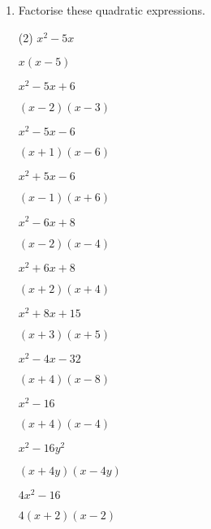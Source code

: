 \begin{enumerate} [leftmargin=0cm]
\item Factorise these quadratic expressions.
\begin{tasks}[label=(\alph*), after-item-skip=2pt,after-skip=3pt, label-width=4ex](2)
    \task  $ x^2 -5x                               $  \\  \begin{envAnswer} $  x(x-5)            $ \end{envAnswer}
    \task  $ x^2 -5x +6                            $  \\  \begin{envAnswer} $  (x-2)(x-3)        $ \end{envAnswer}
    \task  $ x^2 -5x -6                            $  \\  \begin{envAnswer} $  (x+1)(x-6)        $ \end{envAnswer}
    \task  $ x^2 +5x -6                            $  \\  \begin{envAnswer} $  (x-1)(x+6)        $ \end{envAnswer}
    \task  $ x^2 -6x +8                            $  \\  \begin{envAnswer} $  (x-2)(x-4)        $ \end{envAnswer}
    \task  $ x^2 +6x +8                            $  \\  \begin{envAnswer} $  (x+2)(x+4)        $ \end{envAnswer}
    \task  $ x^2 +8x +15                           $  \\  \begin{envAnswer} $  (x+3)(x+5)        $ \end{envAnswer}
    \task  $ x^2 -4x -32                           $  \\  \begin{envAnswer} $  (x+4)(x-8)        $ \end{envAnswer}
    \task  $ x^2 -16                               $  \\  \begin{envAnswer} $  (x+4)(x-4)        $ \end{envAnswer}
    \task  $ x^2 -16y^2                            $  \\  \begin{envAnswer} $  (x+4y)(x-4y)      $ \end{envAnswer}
    \task  $ 4x^2 -16                              $  \\  \begin{envAnswer} $  4(x+2)(x-2)       $ \end{envAnswer}

\end{tasks}
\end{enumerate}
